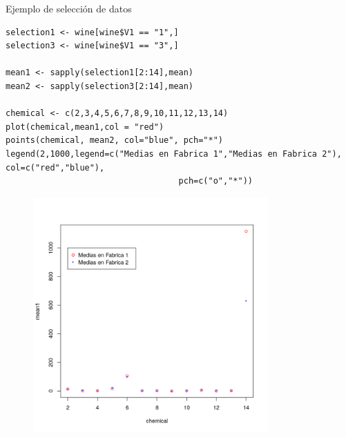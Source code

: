 \documentclass[xcolor=table]{beamer}
\begin{document}
\begin{frame}[fragile]{Ejemplo de selección de datos}
\small
\begin{lstlisting}
selection1 <- wine[wine$V1 == "1",]
selection3 <- wine[wine$V1 == "3",]

mean1 <- sapply(selection1[2:14],mean)
mean2 <- sapply(selection3[2:14],mean)

chemical <- c(2,3,4,5,6,7,8,9,10,11,12,13,14)
plot(chemical,mean1,col = "red")
points(chemical, mean2, col="blue", pch="*")
legend(2,1000,legend=c("Medias en Fabrica 1","Medias en Fabrica 2"), col=c("red","blue"),
                                   pch=c("o","*"))
\end{lstlisting}

\begin{figure}
\centering
\includegraphics[width=0.8\textwidth]{means.png}
\end{figure}
\end{frame}
\end{document}
